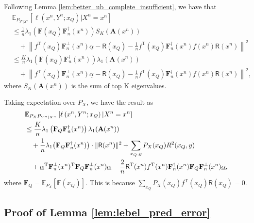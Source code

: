 \documentclass{article} %
\theoremstyle{plain} %
\begin{document}
Following Lemma \ref{lem:better_ub_complete_insufficient}, we have that
\begin{align*}
& \mathbb{E}_{P_{Y^n|X^n}}\left[ 
\ell \left(x^n,Y^n;x_Q\right) | X^n = x^n\right]\\
&\leq \frac1n \lambda_1\left(\mathbf{F}(x_Q)\mathbf{F}_n^{\dagger}(x^n) \right) S_K({\textbf{A}}(x^n))\\
&\quad +
\left\| f ^{\mathrm{T}}(x_Q)\mathbf{F}_n^\perp(x^n)\underline{\alpha} - \mathsf{R}(x_Q) - \frac1n f^\mathrm{T}(x_Q)\mathbf{F}_n^{\dagger}(x^n)f(x^n)\mathsf{R}(x^n)\right\|^2\\
& \leq \frac{K}{n} \lambda_1\left(\mathbf{F}(x_Q)\mathbf{F}_n^{\dagger}(x^n) \right) \lambda_1({\textbf{A}}(x^n))\\
&\quad +
\left\| f ^{\mathrm{T}}(x_Q)\mathbf{F}_n^\perp(x^n)\underline{\alpha} - \mathsf{R}(x_Q) - \frac1n f^\mathrm{T}(x_Q)\mathbf{F}_n^{\dagger}(x^n)f(x^n)\mathsf{R}(x^n)\right\|^2,
\end{align*}
where $S_K({\textbf{A}}(x^n))$ is the sum of top K eigenvalues.

Taking expectation over $P_{X}$, we have the result as
\begin{align*}
&\mathbb{E}_{P_{X}P_{Y^n|X^n}}\left[ 
\ell \left(x^n,Y^n;x_Q\right) | X^n = x^n\right]\\ 
&\leq \frac{K}{n}\lambda_1 \left(\mathbf{F}_Q\mathbf{F}_n^\dagger(x^n) \right) \lambda_1(\textbf{A}(x^n))\notag\\
& \quad + \frac1n \lambda_1 \big(\mathbf{F}_Q \mathbf{F}_n^\dagger(x^n)\big)\cdot \| \mathsf{R}(x^n) \|^2 + \sum_{x_Q,y}{P_{X}(x_Q)R^2(x_Q,y)}\\
& \quad + \underline{\alpha}^{\mathrm{T}}\mathbf{F}_n^{\perp}(x^n)^{\mathrm{T}} \mathbf{F}_Q\mathbf{F}_n^{\perp}(x^n)\underline{\alpha} - \frac2n \mathsf{R}^{\mathrm{T}}(x^n)f^{\mathrm{T}}(x^n) \mathbf{F}_n^\dagger(x^n)\mathbf{F}_Q\mathbf{F}_n^{\perp}(x^n)\underline{\alpha},
\end{align*}
where $\mathbf{F}_Q = \mathbb{E}_{P_{X}}[\mathbb{F}(x_Q)]$.
This is because $\sum_{x_Q} P_X(x_Q) f^\mathrm{T}(x_Q)\mathsf{R}(x_Q) = 0$.




\subsection{Proof of Lemma \ref{lem:lebel_pred_error}}\label{append:lemma2_proof}
\end{document}
